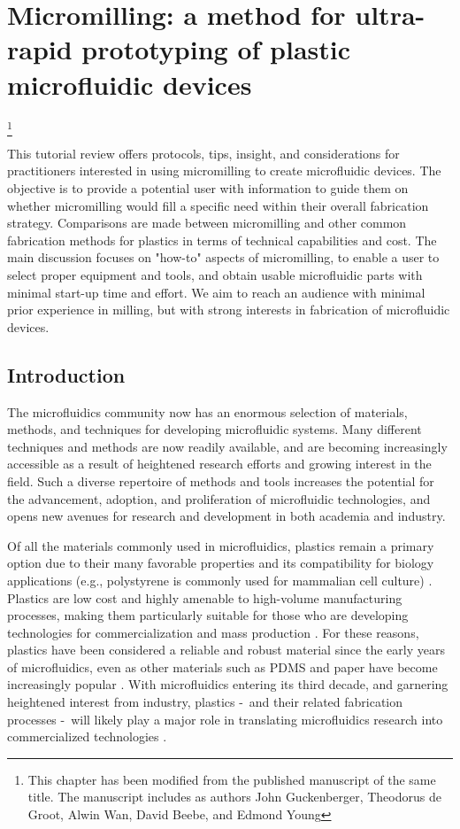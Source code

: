 \chapter{Micromilling: a method for ultra-rapid prototyping of plastic microfluidic devices}\footnote{This chapter has been modified from the published manuscript of the same title. The manuscript includes as authors John Guckenberger, Theodorus de Groot, Alwin Wan, David Beebe, and Edmond Young}
\label{Chap:Micromilling}

This tutorial review offers protocols, tips, insight, and considerations for practitioners interested in using micromilling to create microfluidic devices. The objective is to provide a potential user with information to guide them on whether micromilling would fill a specific need within their overall fabrication strategy. Comparisons are made between micromilling and other common fabrication methods for plastics in terms of technical capabilities and cost. The main discussion focuses on "how-to" aspects of micromilling, to enable a user to select proper equipment and tools, and obtain usable microfluidic parts with minimal start-up time and effort. We aim to reach an audience with minimal prior experience in milling, but with strong interests in fabrication of microfluidic devices.

\section{Introduction}
The microfluidics community now has an enormous selection of materials, methods, and techniques for developing microfluidic systems. Many different techniques and methods are now readily available, and are becoming increasingly accessible as a result of heightened research efforts and growing interest in the field. Such a diverse repertoire of methods and tools increases the potential for the advancement, adoption, and proliferation of microfluidic technologies, and opens new avenues for research and development in both academia and industry. 

Of all the materials commonly used in microfluidics, plastics remain a primary option due to their many favorable properties and its compatibility for biology applications (e.g., polystyrene is commonly used for mammalian cell culture) \cite{Young2011}. Plastics are low cost and highly amenable to high-volume manufacturing processes, making them particularly suitable for those who are developing technologies for commercialization and mass production \cite{Mukhopadhyay2007}. For these reasons, plastics have been considered a reliable and robust material since the early years of microfluidics, even as other materials such as PDMS and paper have become increasingly popular \cite{Becker2000a, Berthier2012}. With microfluidics entering its third decade, and garnering heightened interest from industry, plastics -\, and their related fabrication processes \hyphen\, will likely play a major role in translating microfluidics research into commercialized technologies \cite{Sackmann2014}.

